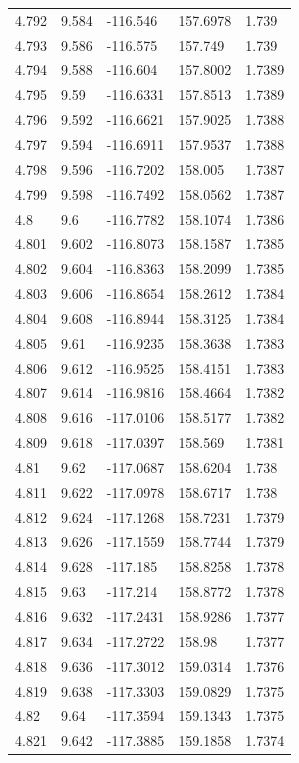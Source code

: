 \begin{tabular}{lllll}
4.792 & 9.584 & -116.546 & 157.6978 & 1.739 \\
4.793 & 9.586 & -116.575 & 157.749 & 1.739 \\
4.794 & 9.588 & -116.604 & 157.8002 & 1.7389 \\
4.795 & 9.59 & -116.6331 & 157.8513 & 1.7389 \\
4.796 & 9.592 & -116.6621 & 157.9025 & 1.7388 \\
4.797 & 9.594 & -116.6911 & 157.9537 & 1.7388 \\
4.798 & 9.596 & -116.7202 & 158.005 & 1.7387 \\
4.799 & 9.598 & -116.7492 & 158.0562 & 1.7387 \\
4.8 & 9.6 & -116.7782 & 158.1074 & 1.7386 \\
4.801 & 9.602 & -116.8073 & 158.1587 & 1.7385 \\
4.802 & 9.604 & -116.8363 & 158.2099 & 1.7385 \\
4.803 & 9.606 & -116.8654 & 158.2612 & 1.7384 \\
4.804 & 9.608 & -116.8944 & 158.3125 & 1.7384 \\
4.805 & 9.61 & -116.9235 & 158.3638 & 1.7383 \\
4.806 & 9.612 & -116.9525 & 158.4151 & 1.7383 \\
4.807 & 9.614 & -116.9816 & 158.4664 & 1.7382 \\
4.808 & 9.616 & -117.0106 & 158.5177 & 1.7382 \\
4.809 & 9.618 & -117.0397 & 158.569 & 1.7381 \\
4.81 & 9.62 & -117.0687 & 158.6204 & 1.738 \\
4.811 & 9.622 & -117.0978 & 158.6717 & 1.738 \\
4.812 & 9.624 & -117.1268 & 158.7231 & 1.7379 \\
4.813 & 9.626 & -117.1559 & 158.7744 & 1.7379 \\
4.814 & 9.628 & -117.185 & 158.8258 & 1.7378 \\
4.815 & 9.63 & -117.214 & 158.8772 & 1.7378 \\
4.816 & 9.632 & -117.2431 & 158.9286 & 1.7377 \\
4.817 & 9.634 & -117.2722 & 158.98 & 1.7377 \\
4.818 & 9.636 & -117.3012 & 159.0314 & 1.7376 \\
4.819 & 9.638 & -117.3303 & 159.0829 & 1.7375 \\
4.82 & 9.64 & -117.3594 & 159.1343 & 1.7375 \\
4.821 & 9.642 & -117.3885 & 159.1858 & 1.7374 \\

\end{tabular}
